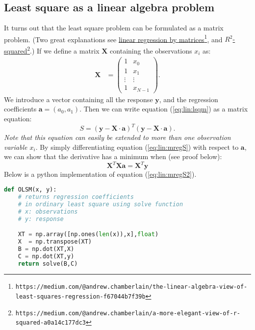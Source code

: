 \documentclass[graybox,sectrefs,envcountresetchap,open=right,final]{svmonodo}
\begin{document}
\subsection{Least square as a linear algebra problem}
It turns out that the least square problem can be formulated as a
matrix problem. (Two great explanations see \href{{https://medium.com/@andrew.chamberlain/the-linear-algebra-view-of-least-squares-regression-f67044b7f39b}}{linear regression by
matrices}\footnote{\texttt{https://medium.com/@andrew.chamberlain/the-linear-algebra-view-of-least-squares-regression-f67044b7f39b}},
and
\href{{https://medium.com/@andrew.chamberlain/a-more-elegant-view-of-r-squared-a0a14c177dc3}}{$R^2$-squared}\footnote{\texttt{https://medium.com/@andrew.chamberlain/a-more-elegant-view-of-r-squared-a0a14c177dc3}}.)
If we define a matrix $\mathbf{X}$ containing the observations $x_i$
as:
\begin{align}
\mathbf{X} &=
\begin{pmatrix}
1&x_0\\ 
1&x_1\\ 
\vdots&\vdots\\ 
1&x_{N-1}
\end{pmatrix}.
\label{eq:lin:mreg1}
\end{align}
We introduce a vector containing all the response $\mathbf{y}$, and the
regression coefficients $\mathbf{a}=(a_0,a_1)$. Then we can write
equation (\ref{eq:lin:lsqm}) as a matrix equation:
\begin{equation}
S=(\mathbf{y}-\mathbf{X\cdot a})^T(\mathbf{y}-\mathbf{X\cdot a}).
\label{eq:lin:mregS}
\end{equation}
\emph{Note that this equation can easily be extended to more than one
observation variable $x_i$}. By simply differentiating equation
(\ref{eq:lin:mregS}) with respect to $\mathbf{a}$, we can show that
the derivative has a minimum when (see proof below):
\begin{equation}
\mathbf{X}^T\mathbf{X a}=\mathbf{X}^T\mathbf{y}
\label{eq:lin:mregS2}
\end{equation}
Below is a python implementation of equation (\ref{eq:lin:mregS2}).












\begin{lstlisting}[language=python,style=blue1]
def OLSM(x, y): 
    # returns regression coefficients
    # in ordinary least square using solve function
    # x: observations
    # y: response

    XT = np.array([np.ones(len(x)),x],float)
    X  = np.transpose(XT)
    B = np.dot(XT,X)
    C = np.dot(XT,y)
    return solve(B,C)

\end{lstlisting}
\end{document}
